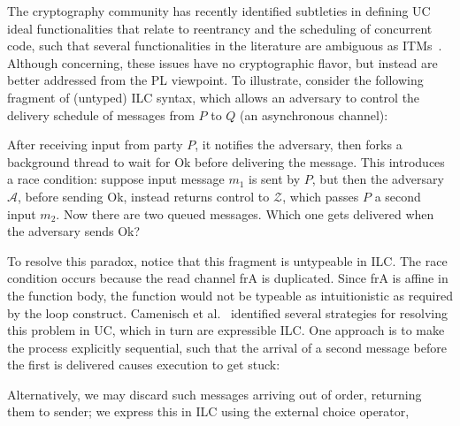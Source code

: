 The cryptography community has recently identified subtleties in defining UC ideal functionalities that relate to reentrancy and the scheduling of concurrent code, such that
several functionalities in the literature are ambiguous as ITMs~\cite{camenisch2016universal}.
Although concerning, these issues have no cryptographic flavor, but instead are better addressed from the PL viewpoint.
To illustrate, consider the following fragment of (untyped) ILC syntax, which allows an adversary to control the delivery schedule of messages from $P$ to $Q$ (an asynchronous channel):

After receiving input from party $P$, it
notifies the adversary, then forks a background thread to wait for \textsf{Ok} before
delivering the message.
This introduces a race condition: suppose input message $m_1$ is sent by $P$, but then the adversary $\mathcal A$, before sending \textsf{Ok}, instead returns control to $\mathcal Z$, which passes $P$ a second input $m_2$. Now there are two queued messages. Which one gets delivered when the adversary sends \textsf{Ok}?

To resolve this paradox, notice that this fragment is untypeable in ILC.
The race condition occurs because the read channel \textsf{frA} is duplicated.
Since \textsf{frA} is affine in the function body, the function would not be typeable as intuitionistic as required by the \textsf{loop} construct.
Camenisch et al.~\cite{camenisch2016universal} identified several strategies for resolving this problem in UC, which in turn are expressible ILC. One approach is to make the process explicitly sequential, such that the arrival of a second message before the first is delivered causes execution to get stuck:

Alternatively, we may discard such messages arriving out of order, returning them to sender; we express this in ILC using the external choice operator,

